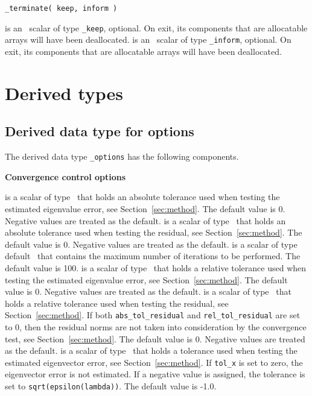 \documentclass{spral}
\begin{document}
\medskip

\hspace{8mm} {\tt \solver\_terminate( keep, inform )}

\begin{description}
%
 is an \intentinout\ scalar of type 
{\tt \solver\_keep}, optional. 
On exit, its components that are allocatable arrays will have been deallocated. 
%
 is an \intentinout\ scalar of type {\tt \solver\_inform}, 
optional.
On exit, its components that are allocatable arrays will have been deallocated. 
%
\end{description}

\section{Derived types}

\subsection{Derived data type for options}

\label{sec:options}

The derived data type
{\tt \solver\_options}
has the following components.

\bigskip
\noindent
{\bf Convergence control options}

\begin{description}
%
 is a scalar of type %
\REALDP\ that
holds an absolute tolerance used when testing the estimated eigenvalue 
error, see Section~\ref{sec:method}. 
The default value is 0. %
Negative values are treated as the default.
%
 is a scalar of type \REALDP\ that
holds an absolute tolerance used when testing the residual, 
see Section~\ref{sec:method}.
The default value is 0.
Negative values are treated as the default.
%
 is a scalar of type default \Integer\ that
contains the maximum number of iterations to be performed.
The default value is 100. %
%
 is a scalar of type \REALDP\ that
holds a relative tolerance used when testing the estimated eigenvalue 
error, see Section~\ref{sec:method}. 
The default value is 0. 
Negative values are treated as the default.
%
 is a scalar of type \REALDP\ that
holds a relative tolerance used when testing the residual,
see Section~\ref{sec:method}. 
If both {\tt abs\_tol\_residual} and {\tt rel\_tol\_residual}
are set to 0, then the residual norms are not taken
into consideration by the convergence test,
see Section~\ref{sec:method}.
The default value is 0.
Negative values are treated as the default.
%
 is a scalar of type \REALDP\ 
that holds a tolerance used when testing the estimated 
eigenvector error, see Section~\ref{sec:method}. 
If {\tt tol\_x} is set to zero, the eigenvector error is not estimated.
If a negative value is assigned, the tolerance is set to
{\tt sqrt(epsilon(lambda))}.
The default value is -1.0.
%
\end{description}
\end{document}
